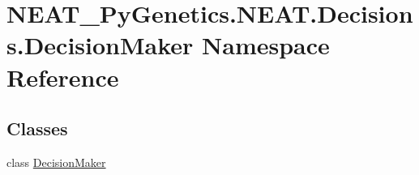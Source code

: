 \hypertarget{namespaceNEAT__PyGenetics_1_1NEAT_1_1Decisions_1_1DecisionMaker}{}\section{N\+E\+A\+T\+\_\+\+Py\+Genetics.\+N\+E\+A\+T.\+Decisions.\+Decision\+Maker Namespace Reference}
\label{namespaceNEAT__PyGenetics_1_1NEAT_1_1Decisions_1_1DecisionMaker}
\subsection*{Classes}
\begin{DoxyCompactItemize}
\item 
class \hyperlink{classNEAT__PyGenetics_1_1NEAT_1_1Decisions_1_1DecisionMaker_1_1DecisionMaker}{Decision\+Maker}
\end{DoxyCompactItemize}

